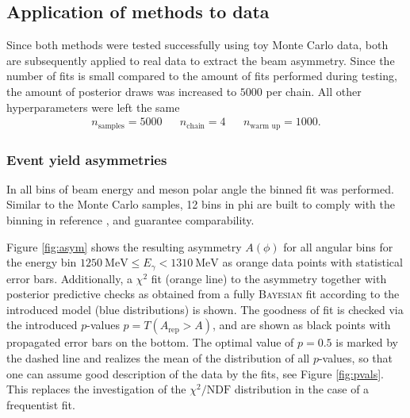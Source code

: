 \subsection{Application of methods to data}
Since both methods were tested successfully using toy Monte Carlo data, both are subsequently applied to real data to extract the beam asymmetry. Since the number of fits is small compared to the amount of fits performed during testing, the amount of posterior draws was increased to $5000$ per chain. All other hyperparameters were left the same
\begin{align}
	n_\text{samples}=5000 && n_\text{chain}=4 && n_\text{warm up}=1000.
\end{align}
\subsubsection{Event yield asymmetries}
In all bins of beam energy and meson polar angle the binned fit was performed. Similar to the Monte Carlo samples, 12 bins in phi are built to comply with the binning in reference \cite{farahphd}, and guarantee comparability.

Figure \ref{fig:asym} shows the resulting asymmetry $A(\phi)$ for all angular bins for the energy bin $\SI{1250}{\mega\eV}\leq E_\gamma<\SI{1310}{\mega\eV}$ as orange data points with statistical error bars.  Additionally, a $\chi^2$ fit (orange line) to the asymmetry together with posterior predictive checks as obtained from a fully \textsc{Bayesian} fit according to the introduced model (blue distributions) is shown. The goodness of fit is checked via the introduced $p$-values $p=T(A_\text{rep}>A)$, and are shown as black points with propagated error bars on the bottom. The optimal value of $p=0.5$ is marked by the dashed line and realizes the mean of the distribution of all $p$-values, so that one can assume good description of the data by the fits, see Figure \ref{fig:pvals}. This replaces the investigation of the $\chi^2/\text{NDF}$ distribution in the case of a frequentist fit.   

